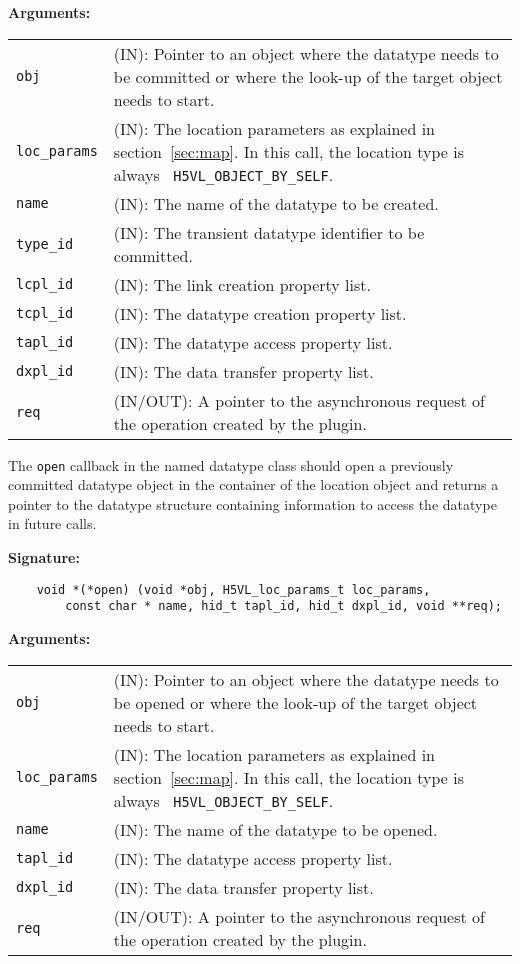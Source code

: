 \textbf{Arguments:}\\
\begin{tabular}{l p{10cm}}
  {\tt obj} & (IN): Pointer to an object where the datatype needs
  to be committed or where the look-up of the target object needs to
  start.\\
  {\tt loc\_params} & (IN): The location parameters as explained in
  section~\ref{sec:map}. In this call, the location type is always {\tt
    H5VL\_OBJECT\_BY\_SELF}. \\
  {\tt name} & (IN): The name of the datatype to be created.\\
  {\tt type\_id} & (IN): The transient datatype identifier to be
  committed. \\
  {\tt lcpl\_id} & (IN): The link creation property list. \\
  {\tt tcpl\_id} & (IN): The datatype creation property list.\\
  {\tt tapl\_id} & (IN): The datatype access property list.\\
  {\tt dxpl\_id} & (IN): The data transfer property list.\\
  {\tt req} & (IN/OUT): A pointer to the asynchronous request of the
  operation created by the plugin.\\
\end{tabular}

The {\tt open} callback in the named datatype class should open a
previously committed datatype object in the container of the location
object and returns a pointer to the datatype structure containing
information to access the datatype in future calls.

\textbf{Signature:}
\begin{lstlisting}
    void *(*open) (void *obj, H5VL_loc_params_t loc_params, 
        const char * name, hid_t tapl_id, hid_t dxpl_id, void **req);
\end{lstlisting}

\textbf{Arguments:}\\
\begin{tabular}{l p{10cm}}
  {\tt obj} & (IN): Pointer to an object where the datatype needs
  to be opened or where the look-up of the target object needs to
  start.\\
  {\tt loc\_params} & (IN): The location parameters as explained in
  section~\ref{sec:map}. In this call, the location type is always {\tt
    H5VL\_OBJECT\_BY\_SELF}. \\
  {\tt name} & (IN): The name of the datatype to be opened.\\
  {\tt tapl\_id} & (IN): The datatype access property list.\\
  {\tt dxpl\_id} & (IN): The data transfer property list.\\
  {\tt req} & (IN/OUT): A pointer to the asynchronous request of the
  operation created by the plugin.\\
\end{tabular}

